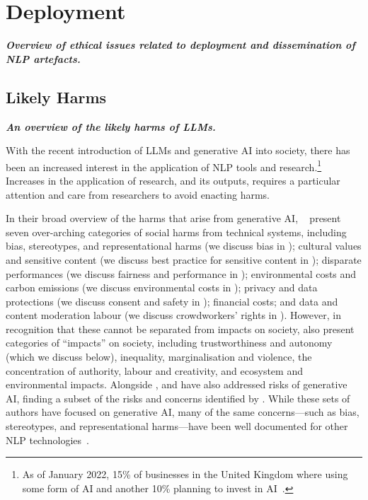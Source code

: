 \section{Deployment}\label{sec:deploy}
\noindent\textbf{\textit{Overview of ethical issues related to deployment and dissemination of NLP artefacts.}}

\subsection{Likely Harms}\label{subsec:harms}\noindent\textbf{\textit{An overview of the likely harms of LLMs.}}
\newline 

\noindent With the recent introduction of LLMs and generative AI into society, there has been an increased interest in the application of NLP tools and research.\footnote{As of January 2022, 15\% of businesses in the United Kingdom where using some form of AI and another 10\% planning to invest in AI~\cite{CapitalEconomics_AI_2022}.} 
Increases in the application of research, and its outputs, requires a particular attention and care from researchers to avoid enacting harms.

In their broad overview of the harms that arise from generative AI, ~\citet{Solaiman_Evaluating_2024} present seven over-arching categories of social harms from technical systems, including bias, stereotypes, and representational harms (we discuss bias in ); cultural values and sensitive content (we discuss best practice for sensitive content in ); disparate performances (we discuss fairness and performance in ); environmental costs and carbon emissions (we discuss environmental costs in ); privacy and data protections (we discuss consent and safety in ); financial costs; and data and content moderation labour (we discuss crowdworkers' rights in ). However, in recognition that these cannot be separated from impacts on society, \citet{Solaiman_Evaluating_2024} also present categories of ``impacts'' on society, including trustworthiness and autonomy (which we discuss below), 
inequality, marginalisation and violence, 
the concentration of authority, 
labour and creativity, 
and ecosystem and environmental impacts. 
Alongside \citet{Solaiman_Evaluating_2024}, \citet{weidinger_ethical_2021} and \citet{kumar_language_2022} have also addressed risks of generative AI, finding a subset of the risks and concerns identified by \citet{Solaiman_Evaluating_2024}. While these sets of authors have focused on generative AI, many of the same concerns---such as bias, stereotypes, and representational harms---have been well documented for other NLP technologies~\cite[e.g.,][]{Anand_Don_2024,Bolukbasi_Man_2016,Davidson_Racial_2019,De-Arteaga_Bias_2019}.

